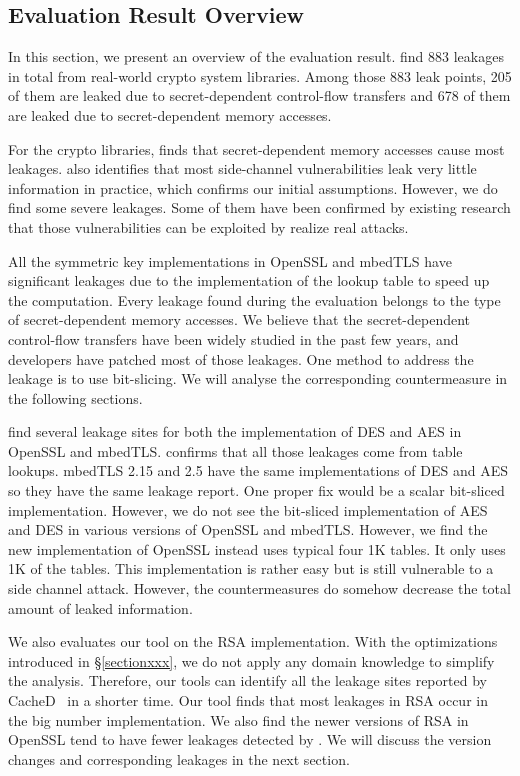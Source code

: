 \subsection{Evaluation Result Overview}
In this section, we present an overview of the evaluation result. 
\tool{} find 883 leakages in total from real-world crypto system libraries.
Among those 883 leak points, 205 of them are leaked due
to secret-dependent control-flow transfers and 678 of them are leaked 
due to secret-dependent memory accesses. 

For the crypto libraries, \tool{} finds that secret-dependent memory accesses 
cause most leakages. 
\tool{} also identifies that most side-channel vulnerabilities 
leak very little information in practice, which confirms our initial
assumptions. 
However, we do find some severe leakages. 
Some of them have been confirmed by existing research that those 
vulnerabilities can be exploited by realize real attacks. 

All the symmetric key implementations in OpenSSL and mbedTLS have
significant leakages due to the implementation of the lookup table
to speed up the computation. Every leakage found during the evaluation
belongs to the type of secret-dependent memory accesses. We believe that
the secret-dependent control-flow transfers have been widely studied in
the past few years, and developers have patched most of those leakages. 
One method to address the leakage is to use bit-slicing. We will analyse
the corresponding countermeasure in the following sections.

\tool{} find several leakage sites for both the implementation of DES and AES
in OpenSSL and mbedTLS\@. \tool{} confirms that all those leakages come from
table lookups. mbedTLS 2.15 and 2.5 have the same implementations
of DES and AES so they have the same leakage report. One proper fix would be 
a scalar bit-sliced implementation. However, we do not see the bit-sliced 
implementation of AES and DES in various versions of OpenSSL and mbedTLS\@.  
However, we find the new implementation of OpenSSL instead uses typical four 1K
tables. It only uses 1K of the tables. This implementation is rather easy but is
still vulnerable to a side channel attack. However, the countermeasures do
somehow decrease the total amount of leaked information.

We also evaluates our tool on the RSA implementation. With the optimizations
introduced in \S\ref{sectionxxx}, we do not apply any domain knowledge to 
simplify the analysis. Therefore, our tools can identify all the leakage 
sites reported by CacheD~\cite{203878} in a shorter time. Our tool
 finds that most leakages in RSA occur in the big number implementation.
We also find the newer versions of RSA in OpenSSL tend to have fewer leakages detected
by \tool{}. We will discuss the version changes and corresponding leakages 
in the next section.

